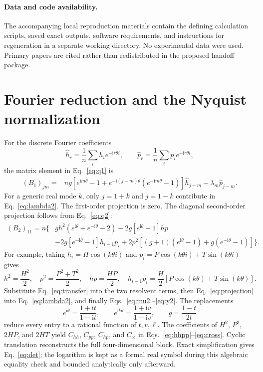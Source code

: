 \documentclass[aps,pre,onecolumn,11pt,notitlepage,nofootinbib]{revtex4-2}
\newcommand{\mean}[1]{\overline{#1}}
\begin{document}
\paragraph*{Data and code availability.}
The accompanying local reproduction materials contain the defining calculation scripts, saved exact outputs, software requirements, and instructions for regeneration in a separate working directory. No experimental data were used. Primary papers are cited rather than redistributed in the proposed handoff package.

\appendix
\section{Fourier reduction and the Nyquist normalization}
For the discrete Fourier coefficients
\begin{equation}
 \widehat h_r=\frac1n\sum_i h_i e^{-\mathrm{i}r\theta i},\qquad
 \widehat p_r=\frac1n\sum_i p_i e^{-\mathrm{i}r\theta i},
\end{equation}
the matrix element in Eq.~\eqref{eq:q1} is
\begin{align}
 (B_1)_{jm}={}&ng\left[e^{\mathrm{i}m\theta}-1
       +e^{-\mathrm{i}(j-m)\theta}(e^{-\mathrm{i}m\theta}-1)\right]\widehat h_{j-m}
       -\lambda_m\widehat p_{j-m}.
 \label{eq:transfer}
\end{align}
For a generic real mode $k$, only $j=1+k$ and $j=1-k$ contribute in Eq.~\eqref{eq:lambda2}. The first-order projection is zero. The diagonal second-order projection follows from Eq.~\eqref{eq:q2}:
\begin{align}
 (B_2)_{11}=n\big\{&g\mean{h^2}(e^{\mathrm{i}\theta}+e^{-\mathrm{i}\theta}-2)
       -2g[e^{\mathrm{i}\theta}-1]\mean{hp}\nonumber\\
       &-2g[e^{-\mathrm{i}\theta}-1]\mean{h_{i-1}p_i}
       +2\mean{p^2}[(g+1)(e^{\mathrm{i}\theta}-1)+g(e^{-\mathrm{i}\theta}-1)]\big\}.
 \label{eq:projection}
\end{align}
For example, taking $h_i=H\cos(k\theta i)$ and $p_i=P\cos(k\theta i)+T\sin(k\theta i)$ gives
\begin{equation}
 \mean{h^2}=\frac{H^2}{2},\quad \mean{p^2}=\frac{P^2+T^2}{2},\quad
 \mean{hp}=\frac{HP}{2},\quad
 \mean{h_{i-1}p_i}=\frac H2[P\cos(k\theta)+T\sin(k\theta)].
\end{equation}
Substitute Eq.~\eqref{eq:transfer} into the two resolvent terms, then Eq.~\eqref{eq:projection} into Eq.~\eqref{eq:lambda2}, and finally Eqs.~\eqref{eq:mu2}--\eqref{eq:y2}. The replacements
\begin{equation}
 e^{\mathrm{i}\theta}=\frac{1+\mathrm{i}t}{1-\mathrm{i}t},\qquad
 e^{\mathrm{i}k\theta}=\frac{1+\mathrm{i}v}{1-\mathrm{i}v},\qquad
 g=\frac{1-t}{2t}
\end{equation}
reduce every entry to a rational function of $t,v,\ell$. The coefficients of $H^2$, $P^2$, $2HP$, and $2HT$ yield $C_{hh}$, $C_{pp}$, $C_{hp}$, and $C_{\times}$ in Eqs.~\eqref{eq:hhpp}--\eqref{eq:cross}. Cyclic translation reconstructs the full four-dimensional block. Exact simplification gives Eq.~\eqref{eq:det}; the logarithm is kept as a formal real symbol during this algebraic equality check and bounded analytically only afterward.
\end{document}
